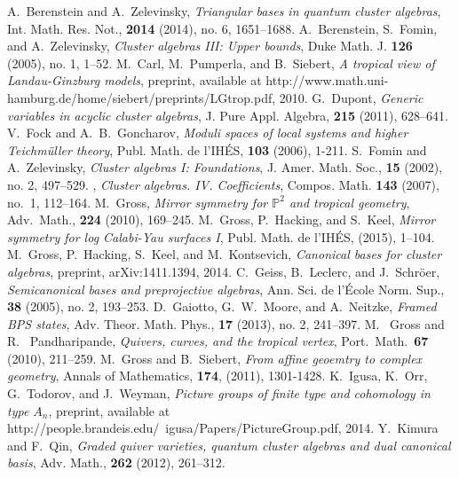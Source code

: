 \documentclass[11pt]{amsart}
\theoremstyle{remark}
\numberwithin{equation}{section}
\begin{document}
\begin{thebibliography}{99}
  
   A.~Berenstein and A.~Zelevinsky, \emph{Triangular bases in quantum cluster algebras}, Int. Math. Res. Not., \textbf{2014} (2014), no. 6, 1651--1688.
   A.~Berenstein, S.~Fomin, and A.~Zelevinsky, \emph{Cluster algebras III: Upper bounds}, Duke Math. J. \textbf{126} (2005), no. 1, 1--52.
   M.~Carl, M.~Pumperla, and B.~Siebert, \emph{A tropical view of Landau-Ginzburg models}, preprint, available at http://www.math.uni-hamburg.de/home/siebert/preprints/LGtrop.pdf, 2010.
   G.~Dupont, \emph{Generic variables in acyclic cluster algebras}, J. Pure Appl. Algebra, \textbf{215} (2011), 628--641.
   V.~Fock and A.~B.~Goncharov, \emph{Moduli spaces of local systems and higher Teichm\"{u}ller theory}, Publ. Math. de l'IH\'{E}S, {\bf 103} (2006), 1-211.
   S.~Fomin and A.~Zelevinsky, \emph{Cluster algebras I: Foundations},  J. Amer. Math. Soc., \textbf{15} (2002), no. 2, 497--529.
   \bysame, \emph{Cluster algebras. {IV}. {C}oefficients}, Compos. Math. \textbf{143} (2007), no.~1, 112--164.
   M.~Gross,  \emph{Mirror symmetry for $\mathbb{P}^2$ and tropical geometry}, Adv.\ Math., {\bf 224} (2010), 169--245. 
   M.~Gross, P.~Hacking, and S.~Keel, \emph{Mirror symmetry for log Calabi-Yau surfaces I}, Publ. Math. de l'IH\'{E}S, (2015), 1--104.
   M.~Gross, P.~Hacking, S.~Keel, and M.~Kontsevich, \emph{Canonical bases for cluster algebras}, preprint, arXiv:1411.1394, 2014.
   C.~Geiss, B.~Leclerc, and J.~Schr\"{o}er, \emph{Semicanonical bases and preprojective algebras}, Ann. Sci. de l'\'{E}cole Norm. Sup., {\bf 38} (2005), no. 2, 193--253.
   D.~Gaiotto, G.~W.~Moore, and A.~Neitzke, \emph{Framed BPS states}, Adv. Theor. Math. Phys., {\bf 17} (2013), no. 2, 241--397.
   M. ~Gross and R. ~Pandharipande, \emph{Quivers, curves, and the tropical vertex}, Port.\ Math.\ {\bf 67} (2010), 211--259. 
   M.~Gross and B.~Siebert, \emph{From affine geoemtry to complex geometry}, Annals of Mathematics, {\bf 174}, (2011), 1301-1428.
   K.~Igusa, K.~Orr, G.~Todorov, and J.~Weyman, \emph{Picture groups of finite type and cohomology in type $A_n$}, preprint, available at http://people.brandeis.edu/~igusa/Papers/PictureGroup.pdf, 2014.
   Y.~Kimura and F.~Qin, \emph{Graded quiver varieties, quantum cluster algebras and dual canonical basis}, Adv. Math., {\bf 262} (2012), 261--312.

\end{thebibliography}
\end{document}

